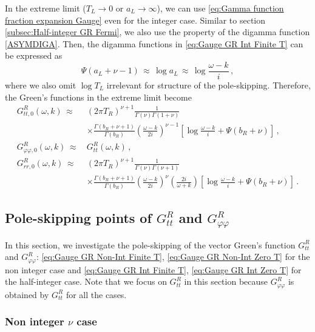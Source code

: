 \documentclass[11pt,a4paper]{article}
\newcommand{\ra}{\rightarrow}
\begin{document}
In the extreme limit ($T_{L} \ra 0$ or $a_L \ra \infty$), we can use \eqref{eq:Gamma function fraction expansion Gauge} even for the integer case. Similar to section \ref{subsec:Half-integer GR Fermi}, we also use the property of the digamma function \eqref{ASYMDIGA}. Then, the digamma functions in \eqref{eq:Gauge GR Int Finite T} can be expressed as
\begin{equation}
    \Psi(a_L+\nu-1) \, \approx \, \log a_L \, \approx \, \log \frac{\omega-k}{i}\,,
\end{equation}
where we also omit $\log T_L$ irrelevant for structure of the pole-skipping. Therefore, the Green's functions in the extreme limit become
\begin{equation} \label{eq:Gauge GR Int Zero T}
\begin{aligned}
    G^R_{tt,0}(\omega, k) \, \approx \, & (2\pi T_R)^{\nu+1} \frac{1}{\Gamma(\nu)\Gamma(1+\nu)}\\
    & \times \frac{\Gamma(b_R+\nu+1)}{\Gamma(b_R)} \left( \frac{\omega-k}{2i} \right)^{\nu-1} \left[\log{\frac{\omega-k}{i}} +\Psi(b_R+\nu) \right]\,,\\
    G^R_{\varphi \varphi,0}(\omega, k) \,\approx \, & G^R_{tt}(\omega, k)\,, \\
    G^R_{rr,0}(\omega, k) \,\approx \, & (2\pi T_R)^{\nu+1} \frac{1}{\Gamma(\nu)\Gamma(\nu+1)}\\
    & \times \frac{\Gamma(b_R+\nu+1)}{\Gamma(b_R)} \left( \frac{\omega-k}{2i} \right)^{\nu}\left( \frac{2i}{\omega+k} \right) \left[\log{\frac{\omega-k}{i}} + \Psi(b_R+\nu) \right]\,.
\end{aligned}
\end{equation}


\subsection{Pole-skipping points of $G^R_{tt}$ and $G^R_{\varphi \varphi}$}
In this section, we investigate the pole-skipping of the vector Green's function $G^R_{tt}$ and $G^R_{\varphi \varphi}$: \eqref{eq:Gauge GR Non-Int Finite T}, \eqref{eq:Gauge GR Non-Int Zero T} for the non integer case and \eqref{eq:Gauge GR Int Finite T}, \eqref{eq:Gauge GR Int Zero T} for the half-integer case. Note that we focus on $G^R_{tt}$ in this section because $G^R_{\varphi \varphi}$ is obtained by $G^R_{tt}$ for all the cases.


\subsubsection{Non integer $\nu$ case}
\end{document}
